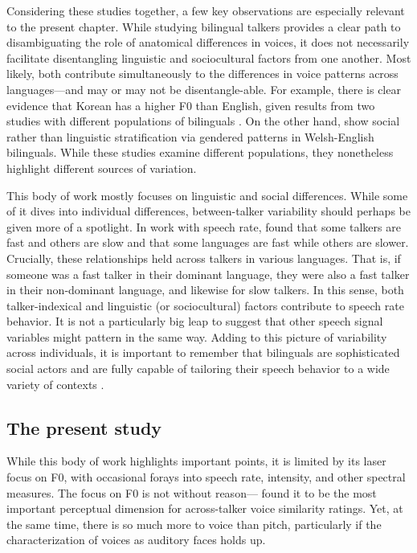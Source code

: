 Considering these studies together, a few key observations are especially relevant to the present chapter. While studying bilingual talkers provides a clear path to disambiguating the role of anatomical differences in voices, it does not necessarily facilitate disentangling linguistic and sociocultural factors from one another. Most likely, both contribute simultaneously to the differences in voice patterns across languages---and may or may not be disentangle-able. For example, there is clear evidence that Korean has a higher F0 than English, given results from two studies with different populations of bilinguals \cite{cheng_2020_f0, lee_2017_bilingual}. On the other hand, \citet{ordin_2017_cross} show social rather than linguistic stratification via gendered patterns in Welsh-English bilinguals. While these studies examine different populations, they nonetheless highlight different sources of variation.

This body of work mostly focuses on linguistic and social differences. While some of it dives into individual differences, between-talker variability should perhaps be given more of a spotlight. In work with speech rate, \citet{bradlow_2017_rate} found that some talkers are fast and others are slow and that some languages are fast while others are slower. Crucially, these relationships held across talkers in various languages. That is, if someone was a fast talker in their dominant language, they were also a fast talker in their non-dominant language, and likewise for slow talkers. In this sense, both talker-indexical and linguistic (or sociocultural) factors contribute to speech rate behavior. It is not a particularly big leap to suggest that other speech signal variables might pattern in the same way. Adding to this picture of variability across individuals, it is important to remember that bilinguals are sophisticated social actors and are fully capable of tailoring their speech behavior to a wide variety of contexts \citep{bullock_2009_sociophonetics}. 

\subsection{The present study}\label{ch3:sec:presentstudy}

While this body of work highlights important points, it is limited by its laser focus on F0, with occasional forays into speech rate, intensity, and other spectral measures. The focus on F0 is not without reason---\citet{perrachione_2019_judgments} found it to be the most important perceptual dimension for across-talker voice similarity ratings. Yet, at the same time, there is so much more to voice than pitch, particularly if the characterization of voices as auditory faces holds up. 

